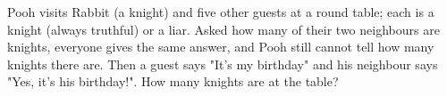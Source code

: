 Pooh visits Rabbit (a knight) and five other guests at a round table; each is a knight (always truthful) or a liar. Asked how many of their two neighbours are knights, everyone gives the same answer, and Pooh still cannot tell how many knights there are. Then a guest says "It's my birthday" and his neighbour says "Yes, it's his birthday!". How many knights are at the table?
